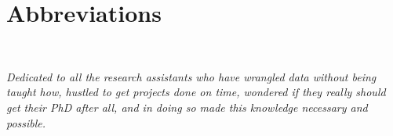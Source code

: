 \documentclass{tufte-book} %
\begin{document}
\cleardoublepage
\chapter*{Abbreviations} %




\tableofcontents %






\cleardoublepage
\thispagestyle{empty}
~\vfill
\begin{doublespace}
\noindent\fontsize{18}{22}\selectfont\itshape
\nohyphenation
Dedicated to all the research assistants who have
wrangled data without being taught how,
hustled to get projects done on time,
wondered if they really should get their PhD after all,
and in doing so made this knowledge necessary and possible.
\end{doublespace}
\vfill
\vfill
\end{document}
